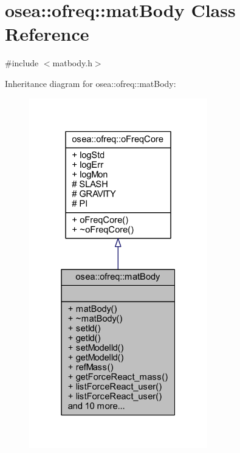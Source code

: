 \hypertarget{classosea_1_1ofreq_1_1mat_body}{\section{osea\-:\-:ofreq\-:\-:mat\-Body Class Reference}
\label{classosea_1_1ofreq_1_1mat_body}
}


{\ttfamily \#include $<$matbody.\-h$>$}



Inheritance diagram for osea\-:\-:ofreq\-:\-:mat\-Body\-:
\nopagebreak
\begin{figure}[H]
\begin{center}
\leavevmode
\includegraphics[width=220pt]{classosea_1_1ofreq_1_1mat_body__inherit__graph}
\end{center}
\end{figure}
